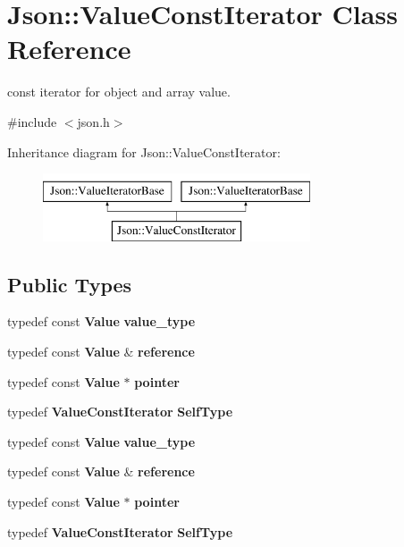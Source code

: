 \section{Json\+:\+:Value\+Const\+Iterator Class Reference}
\label{class_json_1_1_value_const_iterator}


const iterator for object and array value.  




{\ttfamily \#include $<$json.\+h$>$}

Inheritance diagram for Json\+:\+:Value\+Const\+Iterator\+:\begin{figure}[H]
\begin{center}
\leavevmode
\includegraphics[height=2.000000cm]{class_json_1_1_value_const_iterator}
\end{center}
\end{figure}
\subsection*{Public Types}
\begin{DoxyCompactItemize}
\item 
typedef const {\bf Value} {\bfseries value\+\_\+type}\label{class_json_1_1_value_const_iterator_aa5f1707dcef4bfe73e23ddc14dbe760d}

\item 
typedef const {\bf Value} \& {\bfseries reference}\label{class_json_1_1_value_const_iterator_aa9b05c6a37cd352ea1ee6e13b816f709}

\item 
typedef const {\bf Value} $\ast$ {\bfseries pointer}\label{class_json_1_1_value_const_iterator_a400136bd8bc09e9fddec0785fa2cff14}

\item 
typedef {\bf Value\+Const\+Iterator} {\bfseries Self\+Type}\label{class_json_1_1_value_const_iterator_a0c2e33e7eb5a80dd8709fb28ece83933}

\item 
typedef const {\bf Value} {\bfseries value\+\_\+type}\label{class_json_1_1_value_const_iterator_aa5f1707dcef4bfe73e23ddc14dbe760d}

\item 
typedef const {\bf Value} \& {\bfseries reference}\label{class_json_1_1_value_const_iterator_aa9b05c6a37cd352ea1ee6e13b816f709}

\item 
typedef const {\bf Value} $\ast$ {\bfseries pointer}\label{class_json_1_1_value_const_iterator_a400136bd8bc09e9fddec0785fa2cff14}

\item 
typedef {\bf Value\+Const\+Iterator} {\bfseries Self\+Type}\label{class_json_1_1_value_const_iterator_a0c2e33e7eb5a80dd8709fb28ece83933}

\end{DoxyCompactItemize}
